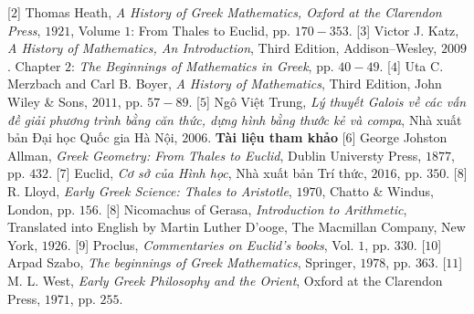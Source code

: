 \begin{multicols}{2}
	\vskip 0.05cm
	[$2$] Thomas Heath, \textit{A History of Greek Mathematics, Oxford at the Clarendon Press}, $1921$, Volume $1$: From Thales to Euclid, pp. $170-353$.
	\vskip 0.05cm   
	[$3$] Victor J. Katz, \textit{A History of Mathematics, An Introduction}, Third Edition, Addison--Wesley, $2009$. Chapter $2$: \textit{The Beginnings of Mathematics in Greek}, pp. $40-49$.
	\vskip 0.05cm
	[$4$] Uta C. Merzbach and Carl B. Boyer, \textit{A
	History of Mathematics}, Third Edition, John Wiley \& Sons, $2011$, pp. $57-89$.
	\vskip 0.05cm
	[$5$] Ngô Việt Trung, \textit{Lý thuyết Galois về các vấn đề giải phương trình bằng căn thức, dựng hình bằng thước kẻ và compa}, Nhà xuất bản Đại học Quốc gia Hà Nội, $2006$.
	\vskip 0.05cm
	\textbf{\color{lichsutoanhoc}Tài liệu tham khảo}
	\vskip 0.05cm 
	[$6$] George Johston Allman, \textit{Greek Geometry: From Thales to Euclid}, Dublin Universty Press, $1877$, pp. $432$.  
	\vskip 0.05cm
	[$7$] Euclid, \textit{Cơ sở của Hình học}, Nhà xuất bản Trí thức, $2016$, pp. $350$.
	\vskip 0.05cm
	[$8$] R. Lloyd, \textit{Early Greek Science: Thales to Aristotle}, $1970$, Chatto \& Windus, London, pp. $156$. 
	\vskip 0.05cm
	[$8$] Nicomachus of Gerasa, \textit{Introduction to Arithmetic}, Translated into English by Martin Luther D’ooge, The Macmillan Company, New York, $1926$.
	\vskip 0.05cm
	[$9$] Proclus, \textit{Commentaries on Euclid’s books}, Vol. $1$, pp. $330$.
	\vskip 0.05cm
	[$10$] Arpad Szabo, \textit{The beginnings of Greek Mathematics}, Springer, $1978$, pp. $363$.
	\vskip 0.05cm
	[$11$] M. L. West, \textit{Early Greek Philosophy and the Orient}, Oxford at the Clarendon Press, $1971$, pp. $255$.
\end{multicols}
